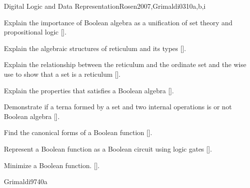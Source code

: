 \begin{syllabus}
\begin{unit}{Digital Logic and Data Representation}{}{Rosen2007,Grimaldi03}{10}{a,b,i}
    \begin{learningoutcomes}
     \item Explain the importance of Boolean algebra as a unification of set theory and propositional logic [\Assessment].
     \item Explain the algebraic structures of reticulum and its types [\Assessment].
     \item Explain the relationship between the reticulum and the ordinate set and the wise use to show that a set is a reticulum [\Assessment].
     \item Explain the properties that satisfies a Boolean algebra [\Assessment].
     \item Demonstrate if a terna formed by a set and two internal operations is or not Boolean algebra [\Assessment].
     \item Find the canonical forms of a Boolean function  [\Assessment].
     \item Represent a Boolean function as a Boolean circuit using logic gates  [\Assessment].
     \item Minimize a Boolean function. [\Assessment].
     \end{learningoutcomes}
  \end{unit}

\begin{unit}{\DSBasicsofCounting}{}{Grimaldi97}{40}{a} 
    \begin{topics}
        \item \DSBasicsofCountingTopicCounting
        \item \DSBasicsofCountingTopicThePigeonhole
        \item \DSBasicsofCountingTopicPermutations
        \item \DSBasicsofCountingTopicSolving
        \item \DSBasicsofCountingTopicBasic
   \end{topics}
   \begin{learningoutcomes}
        \item \DSBasicsofCountingLOApplyCounting [\Familiarity]
        \item \DSBasicsofCountingLOApplyThe[\Familiarity]
        \item \DSBasicsofCountingLOComputePermutations[\Familiarity]
        \item \DSBasicsofCountingLOMap[\Familiarity]
        \item \DSBasicsofCountingLOSolveA[\Familiarity]
        \item \DSBasicsofCountingLOAnalyzeA[\Familiarity]
        \item \DSBasicsofCountingLOPerformComputations[\Familiarity]
   \end{learningoutcomes}
\end{unit}


\end{syllabus}
